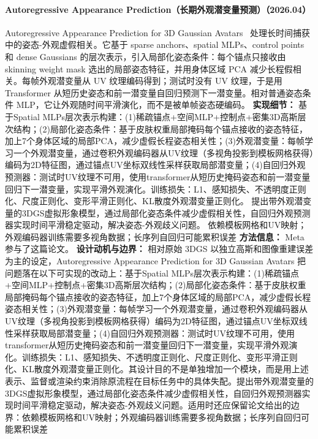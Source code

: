 \paragraph{Autoregressive Appearance Prediction（长期外观潜变量预测）（2026.04）}
Autoregressive Appearance Prediction for 3D Gaussian Avatars~\cite{2604_00928} 处理长时间捕获中的姿态-外观虚假相关。它基于 sparse anchors、spatial MLPs、control points 和 dense Gaussians 的层次表示，引入局部化姿态条件：每个锚点只接收由 skinning weight mask 选出的局部姿态特征，并用身体区域 PCA 减少长程假相关。每帧外观潜变量从 UV 纹理编码得到；测试时没有 UV 纹理，于是用 Transformer 从短历史姿态和前一潜变量自回归预测下一潜变量。相对普通姿态条件 MLP，它让外观随时间平滑演化，而不是被单帧姿态硬编码。
\textbf{实现细节：} 基于Spatial MLPs层次表示构建：(1)稀疏锚点+空间MLP+控制点+密集3D高斯层次结构；(2)局部化姿态条件：基于皮肤权重局部掩码每个锚点接收的姿态特征，加上7个身体区域的局部PCA，减少虚假长程姿态相关性；(3)外观潜变量：每帧学习一个外观潜变量，通过卷积外观编码器从UV纹理（多视角投影到模板网格获得）编码为2D特征图，通过锚点UV坐标双线性采样获取局部潜变量；(4)自回归外观预测器：测试时UV纹理不可用，使用transformer从短历史掩码姿态和前一潜变量回归下一潜变量，实现平滑外观演化。训练损失：L1、感知损失、不透明度正则化、尺度正则化、变形平滑正则化、KL散度外观潜变量正则化。 提出带外观潜变量的3DGS虚拟形象模型，通过局部化姿态条件减少虚假相关性，自回归外观预测器实现时间平滑稳定驱动，解决姿态-外观歧义问题。 依赖模板网格和UV映射；外观编码器训练需要多视角数据；长序列自回归可能累积误差
\textbf{方法信息：} Meta 参与了这篇论文。
\textbf{设计动机与边界：} 相对原始 3DGS 以独立高斯和图像重建误差为主的设定，Autoregressive Appearance Prediction for 3D Gaussian Avatars 把问题落在以下可实现的改动上：基于Spatial MLPs层次表示构建：(1)稀疏锚点+空间MLP+控制点+密集3D高斯层次结构；(2)局部化姿态条件：基于皮肤权重局部掩码每个锚点接收的姿态特征，加上7个身体区域的局部PCA，减少虚假长程姿态相关性；(3)外观潜变量：每帧学习一个外观潜变量，通过卷积外观编码器从UV纹理（多视角投影到模板网格获得）编码为2D特征图，通过锚点UV坐标双线性采样获取局部潜变量；(4)自回归外观预测器：测试时UV纹理不可用，使用transformer从短历史掩码姿态和前一潜变量回归下一潜变量，实现平滑外观演化。训练损失：L1、感知损失、不透明度正则化、尺度正则化、变形平滑正则化、KL散度外观潜变量正则化。其设计目的不是单独增加一个模块，而是用上述表示、监督或渲染约束消除原流程在目标任务中的具体失配。提出带外观潜变量的3DGS虚拟形象模型，通过局部化姿态条件减少虚假相关性，自回归外观预测器实现时间平滑稳定驱动，解决姿态-外观歧义问题。适用时还应保留论文给出的边界：依赖模板网格和UV映射；外观编码器训练需要多视角数据；长序列自回归可能累积误差
